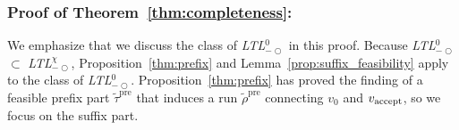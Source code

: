 \documentclass[Afour,sageh,times]{sagej}
\newcommand{\ltlz}{ {\it LTL}$_{-\bigcirc}^0$ }
\newcommand{\vertex}[1]{v_{\textup{#1}}}
\begin{document}
{{%

\subsubsection{Proof of Theorem~\ref{thm:completeness}:}\label{app:completeness_}
We emphasize that we discuss the class of \ltlz in this proof. Because \ltlz$\subset$ {\it LTL}$_{-\bigcirc}^\chi$, Proposition~\ref{thm:prefix} and Lemma~\ref{prop:suffix_feasibility} apply to the class of {\it LTL}$_{-\bigcirc}^0$. Proposition~\ref{thm:prefix} has proved the finding of a feasible prefix part $\tilde{\tau}^{\text{pre}}$ that induces a run $\tilde{\rho}^{\text{pre}}$ connecting $v_0$ and $\vertex{accept}$, so we focus on the suffix part.

}}
\end{document}
